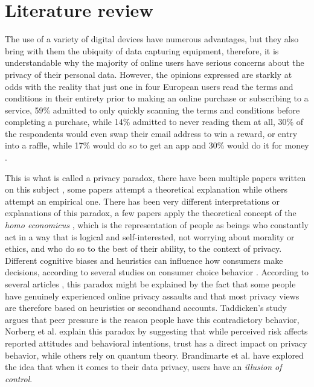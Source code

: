 \documentclass[conference]{IEEEtran}
\begin{document}
\section{Literature review}

The use of a variety of digital devices have numerous advantages, but
they also bring with them the ubiquity of data capturing equipment, therefore,
it is understandable why the majority of online users have serious concerns
about the privacy of their personal data. However, the opinions expressed
are starkly at odds with the reality that just one in four European users
read the terms and conditions in their entirety prior to making an online
purchase or subscribing to a service, 59\% admitted to only quickly scanning
the terms and conditions before completing a purchase, while 14\% admitted
to never reading them at all, 30\% of the respondents would even swap
their email address to win a reward, or entry into a raffle, while 17\% would
do so to get an app and 30\% would do it for money \cite{DarrenState}.

This is what is called a privacy paradox, there have been multiple papers
written on this subject \cite{solove2021myth, WilliamsPrivacy, lee2021investigating, goad2021privacy, gerber2018explaining},
some papers attempt a theoretical explanation while others attempt an empirical one.
There has been very different interpretations or explanations of this paradox,
a few papers \cite{wilson2012unpacking, warshaw2015can, lee2015privacy} apply the theoretical concept of the \textit{homo economicus} \cite{zak2008moral},
which is the representation of people as beings who constantly act in a way
that is logical and self-interested, not worrying about morality or ethics, and
who do so to the best of their ability, to the context of privacy.
Different cognitive biases and heuristics can influence how consumers make decisions,
according to several studies on consumer choice behavior \cite{acquisti2007can, knijnenburg2013dimensionality, wakefield2013influence, flender2012type}.
According to several articles \cite{dienlin2015privacy, baek2014solving}, this paradox might be explained by the
fact that some people have genuinely experienced online privacy assaults
and that most privacy views are therefore based on heuristics or secondhand accounts.
Taddicken's study \cite{taddicken2014privacy} argues that peer pressure is the reason people have this contradictory behavior,
Norberg et al. \cite{norberg2007privacy} explain this paradox by suggesting that while perceived
risk affects reported attitudes and behavioral intentions, trust has a direct
impact on privacy behavior, while others \cite{flender2012type, kokolakis2017privacy} rely on quantum theory.
Brandimarte et al. \cite{brandimarte2013misplaced} have explored the idea that when it comes to their
data privacy, users have an \textit{illusion of control}.
\end{document}
